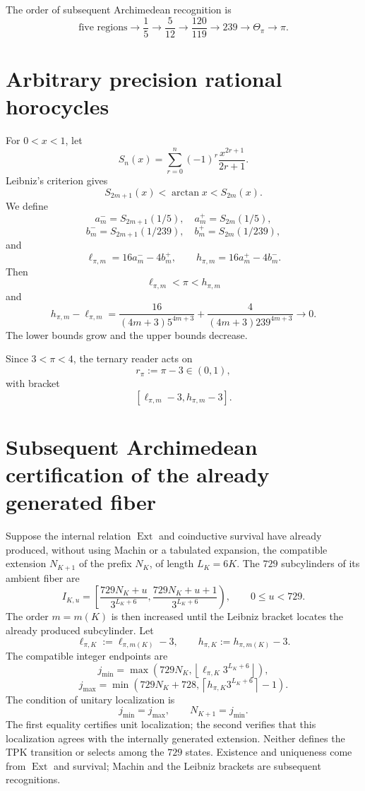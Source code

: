 The order of subsequent Archimedean recognition is
\[
 \text{five regions}
 \to\frac15
 \to\frac5{12}
 \to\frac{120}{119}
 \to239
 \to\Theta_\pi
 \to\pi.
\]

\section{Arbitrary precision rational horocycles}

For \(0<x<1\), let
\[
 S_n(x)=\sum_{r=0}^{n}(-1)^r\frac{x^{2r+1}}{2r+1}.
\]
Leibniz's criterion gives
\[
 S_{2m+1}(x)<\arctan x<S_{2m}(x).
\]
We define
\[
 a_m^-=S_{2m+1}(1/5),\quad a_m^+=S_{2m}(1/5),
\]
\[
 b_m^-=S_{2m+1}(1/239),\quad b_m^+=S_{2m}(1/239),
\]
and
\begin{equation}
 \ell_{\pi,m}=16a_m^- -4b_m^+,
 \qquad
 h_{\pi,m}=16a_m^+ -4b_m^-.
 \label{gfp:b:eq:horquilla-pi-autonoma}
\end{equation}
Then
\[
 \ell_{\pi,m}<\pi<h_{\pi,m}
\]
and
\begin{equation}
 h_{\pi,m}-\ell_{\pi,m}
 =
 \frac{16}{(4m+3)5^{4m+3}}
 +\frac{4}{(4m+3)239^{4m+3}}
 \longrightarrow0.
 \label{gfp:b:eq:anchura-horquilla-pi}
\end{equation}
The lower bounds grow and the upper bounds decrease.

Since \(3<\pi<4\), the ternary reader acts on
\[
 r_\pi:=\pi-3\in(0,1),
\]
with bracket
\[
 [\ell_{\pi,m}-3,h_{\pi,m}-3].
\]

\section{Subsequent Archimedean certification of the already generated fiber}

Suppose the internal relation \(\operatorname{Ext}\) and coinductive
survival have already produced, without using Machin or a tabulated expansion,
the compatible extension \(N_{K+1}\) of the prefix \(N_K\), of length
\(L_K=6K\). The \(729\) subcylinders of its ambient fiber are
\[
 I_{K,u}=
 \left[
 \frac{729N_K+u}{3^{L_K+6}},
 \frac{729N_K+u+1}{3^{L_K+6}}
 \right),
 \qquad0\leq u<729.
\]
The order \(m=m(K)\) is then increased until the Leibniz bracket
locates the already produced subcylinder. Let
\[
 \ell_{\pi,K}:=\ell_{\pi,m(K)}-3,
 \qquad
 h_{\pi,K}:=h_{\pi,m(K)}-3.
\]
The compatible integer endpoints are
\[
 j_{\min}=
 \max\!\left(
 729N_K,\left\lfloor
 \ell_{\pi,K}3^{L_K+6}\right\rfloor
 \right),
\]
\[
 j_{\max}=
 \min\!\left(
 729N_K+728,\left\lceil
 h_{\pi,K}3^{L_K+6}\right\rceil-1
 \right).
\]
The condition of unitary localization is
\begin{equation}
 \boxed{j_{\min}=j_{\max},\qquad N_{K+1}=j_{\min}.}
 \label{gfp:b:eq:seleccion-unitaria-subcilindro-pi}
\end{equation}
The first equality certifies unit localization; the second verifies
that this localization agrees with the internally generated extension. Neither
defines the TPK transition or selects among the \(729\) states.
Existence and uniqueness come from \(\operatorname{Ext}\) and
survival; Machin and the Leibniz brackets are subsequent
recognitions.

